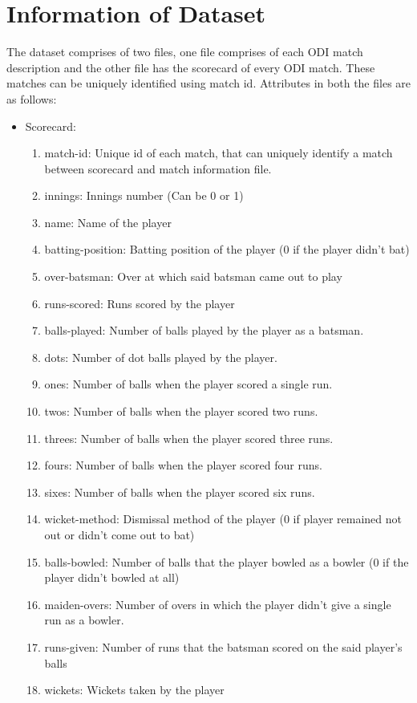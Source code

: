 \documentclass[fleqn,10pt]{wlscirep}
\begin{document}
\section{Information of Dataset}
The dataset comprises of two files, one file comprises of each ODI match description and the other file has the scorecard of every ODI match. These matches can be uniquely
identified using match id. Attributes in both the files are as follows:
\begin{itemize}
\item Scorecard:
\begin{enumerate}
    \item match-id: Unique id of each match, that can uniquely identify a match between scorecard and match information file.
    \item innings: Innings number (Can be 0 or 1)
    \item name: Name of the player
    \item batting-position: Batting position of the player (0 if the player didn't bat)
    \item over-batsman: Over at which said batsman came out to play
    \item runs-scored: Runs scored by the player
    \item balls-played: Number of balls played by the player as a batsman.
    \item dots: Number of dot balls played by the player.
    \item ones: Number of balls when the player scored a single run.
    \item twos: Number of balls when the player scored two runs.
    \item threes: Number of balls when the player scored three runs.
    \item fours: Number of balls when the player scored four runs.
    \item sixes: Number of balls when the player scored six runs.
    \item wicket-method: Dismissal method of the player (0 if player remained not out or didn't come out to bat)
    \item balls-bowled: Number of balls that the player bowled as a bowler (0 if the player didn't bowled at all)
    \item maiden-overs: Number of overs in which the player didn't give a single run as a bowler.
    \item runs-given: Number of runs that the batsman scored on the said player's balls 
    \item wickets: Wickets taken by the player 

\end{enumerate}
\end{itemize}
\end{document}
